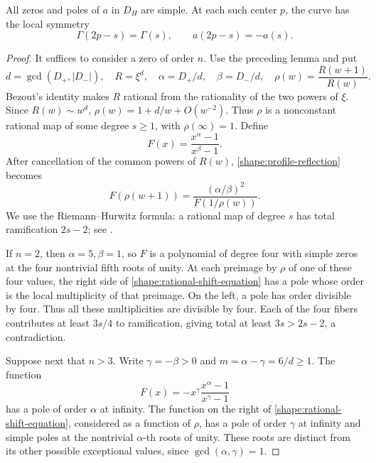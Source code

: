 \begin{lemma}
\label{shape:simple-centers}
All zeros and poles of \(a\) in \(D_H\) are simple. At each such center
\(p\), the curve has the local symmetry
\begin{equation}
 \Gamma(2p-s)=\Gamma(s),\qquad a(2p-s)=-a(s).
 \label{shape:center-reflection}
\end{equation}
\end{lemma}

\begin{proof}
It suffices to consider a zero of order \(n\). Use the preceding
lemma and put
\[
 d=\gcd(D_+,|D_-|),\quad R=\xi^d,\quad
 \alpha=D_+/d,\quad\beta=D_-/d,\quad
 \rho(w)=\frac{R(w+1)}{R(w)}.
\]
Bezout's identity makes \(R\) rational from the rationality of the two
powers of \(\xi\). Since \(R(w)\sim w^d\),
\(\rho(w)=1+d/w+O(w^{-2})\). Thus \(\rho\) is a nonconstant rational
map of some degree \(s\geq1\), with \(\rho(\infty)=1\). Define
\[
 F(x)=\frac{x^\alpha-1}{x^\beta-1}.
\]
After cancellation of the common powers of \(R(w)\),
\eqref{shape:profile-reflection} becomes
\begin{equation}
 F(\rho(w+1))=
 \frac{(\alpha/\beta)^2}{F(1/\rho(w))}.
 \label{shape:rational-shift-equation}
\end{equation}
We use the Riemann--Hurwitz formula: a rational map of degree
\(s\) has total ramification \(2s-2\); see \cite{Forster1981}.

If \(n=2\), then \(\alpha=5,\beta=1\), so \(F\) is a polynomial
of degree four with simple zeros at the four nontrivial fifth roots
of unity. At each preimage by \(\rho\) of one of these four values,
the right side of \eqref{shape:rational-shift-equation} has a pole
whose order is the local multiplicity of that preimage. On the left,
a pole has order divisible by four. Thus all these multiplicities
are divisible by four. Each of the four fibers contributes at least
\(3s/4\) to ramification, giving total at least \(3s>2s-2\), a
contradiction.

Suppose next that \(n>3\). Write \(\gamma=-\beta>0\) and
\(m=\alpha-\gamma=6/d\geq1\). The function
\[
 F(x)=-x^\gamma\frac{x^\alpha-1}{x^\gamma-1}
\]
has a pole of order \(\alpha\) at infinity. The function on the
right of \eqref{shape:rational-shift-equation}, considered as a
function of \(\rho\), has a pole of order \(\gamma\) at infinity
and simple poles at the nontrivial \(\alpha\)-th roots of unity.
These roots are distinct from its other possible exceptional values,
since \(\gcd(\alpha,\gamma)=1\).


\end{proof}
